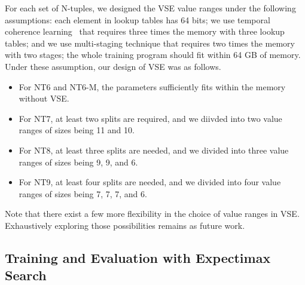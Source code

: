 For each set of N-tuples, we designed the VSE value ranges under the following assumptions: each element in lookup tables has 64 bits; we use temporal coherence learning~\cite{Jask17} that requires three times the memory with three lookup tables; and we use multi-staging technique that requires two times the memory with two stages; the whole training program should fit within 64 GB of memory.
Under these assumption, our design of VSE was as follows.
\begin{itemize}
\item For NT6 and NT6-M, the parameters sufficiently fits within the memory without VSE.
\item For NT7, at least two splits are required, and we diivded into two value ranges of sizes being 11 and 10.
\item For NT8, at least three splits are needed, and we divided into three value ranges of sizes being 9, 9, and 6.
\item For NT9, at least four splits are needed, and we divided into four value ranges of sizes being 7, 7, 7, and 6.
\end{itemize}

Note that there exist a few more flexibility in the choice of value ranges in VSE.
Exhaustively exploring those possibilities remains as future work.

\subsection{Training and Evaluation with Expectimax Search}

